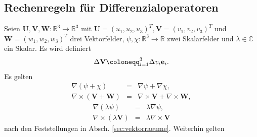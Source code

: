 \documentclass{book}
\let\sum\relax
\DeclareMathOperator*{\sum}{\raisebox{-3.5pt}{\scalebox{2}{\rotatebox{1}{{\bask Σ}}}}}
\begin{document}
\subsection{Rechenregeln für Differenzialoperatoren}
\label{sec:rechenregeln_fuer_differentialoperatoren}

Seien $\mathbf{U}, \mathbf{V}, \mathbf{W}:\mathbb{R}^3\to\mathbb{R}^3$ mit $\mathbf{U} = \left(u_1, u_2, u_3\right)^T, \mathbf{V} = \left(v_1, v_2, v_3\right)^T$ und $\mathbf{W} = \left(w_1, w_2, w_3\right)^T$ drei Vektorfelder, $\psi, \chi:\mathbb{R}^3\to\mathbb{R}$ zwei Skalarfelder und $\lambda\in\mathbb{C}$ ein Skalar. Es wird definiert
%
\begin{eqnarray}
\Delta\mathbf{V} \coloneqq \sum_{i = 1}^{3}\Delta v_i\mathbf{e}_i.
\end{eqnarray}
%
Es gelten
%
\begin{eqnarray}
\nabla\left(\psi + \chi\right) & = & \nabla\psi + \nabla\chi,\\
\nabla\times\left(\mathbf{V} + \mathbf{W}\right) & = & \nabla\times\mathbf{V} + \nabla\times\mathbf{W}, 
\end{eqnarray}
\begin{eqnarray}
\nabla\left(\lambda\psi\right) & = & \lambda\nabla\psi,\\
\nabla\times\left(\lambda\mathbf{V}\right) & = & \lambda\nabla\times\mathbf{V}
\end{eqnarray}
%
nach den Feststellungen in Absch. \ref{sec:vektorraeume}. Weiterhin gelten
%
\end{document}
